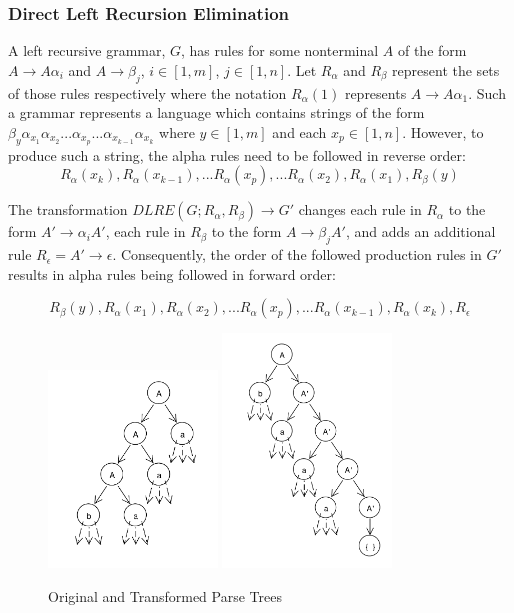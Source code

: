 \documentclass[11pt]{article}
\begin{document}
\subsubsection{Direct Left Recursion Elimination}
A left recursive grammar, $G$, has rules for some nonterminal $A$ of the form
$A \rightarrow A \alpha_i$ and $A \rightarrow \beta_j$, $i \in [1,m]$, $j \in [1,n]$.
Let $R_\alpha$ and $R_\beta$ represent the sets of those rules respectively where the notation
$R_\alpha(1)$ represents $A \rightarrow A \alpha_1$. 
Such a grammar represents a language which contains strings of the form
$\beta_y \alpha_{x_1} \alpha_{x_2} ... \alpha_{x_p}...\alpha_{x_{k-1}} \alpha_{x_k}$ where $y \in [1,m]$ and each $x_p \in [1,n]$.
However, to produce such a string, the alpha rules need to be followed in reverse order:
\[R_\alpha(x_k), R_\alpha(x_{k-1}), ... R_\alpha(x_{p}), ... R_\alpha(x_2), R_\alpha(x_1), R_\beta(y)\]

The transformation \cite{aho} $DLRE(G; R_\alpha, R_\beta) \rightarrow G'$ changes
each rule in $R_\alpha$ to the form $A' \rightarrow \alpha_i A'$, each rule
in $R_\beta$ to the form $A \rightarrow \beta_j A'$, and adds an additional rule
$R_\epsilon = A' \rightarrow \epsilon$. Consequently, the order of the followed production
rules in $G'$ results in alpha rules being followed in forward order:

\[R_\beta(y), R_\alpha(x_1), R_\alpha(x_2), ... R_\alpha(x_p), ... R_\alpha(x_{k-1}),R_\alpha(x_k), R_\epsilon \]


\begin{figure}[h!]
    \centering
    \includegraphics[width=0.4\textwidth,natwidth=1,natheight=1]{umlet/dlre_orig.pdf}
    \includegraphics[width=0.4\textwidth,natwidth=1,natheight=1]{umlet/dlre_comp.pdf}
    \caption{Original and Transformed Parse Trees}
    \label{fig:dlre}
\end{figure}
\end{document}
